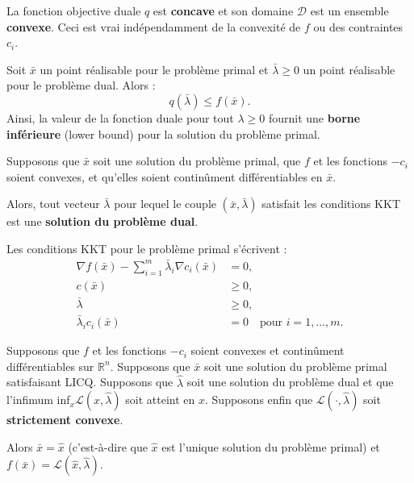 \begin{theoreme}
    La fonction objective duale $q$ est \textbf{concave} et son domaine $\mathcal{D}$ est un ensemble \textbf{convexe}.
    Ceci est vrai indépendamment de la convexité de $f$ ou des contraintes $c_i$.
\end{theoreme}

\begin{theoreme}
    Soit $\bar{x}$ un point réalisable pour le problème primal et $\bar{\lambda} \geq 0$ un point réalisable pour le problème dual. Alors :
    \begin{equation}
        q(\bar{\lambda}) \leq f(\bar{x}).
    \end{equation}
    Ainsi, la valeur de la fonction duale pour tout $\lambda \geq 0$ fournit une \textbf{borne inférieure} (lower bound) pour la solution du problème primal.
\end{theoreme}

\begin{theoreme}
    Supposons que $\bar{x}$ soit une solution du problème primal, que $f$ et les fonctions $-c_i$ soient convexes, et qu'elles soient continûment différentiables en $\bar{x}$.
    
    Alors, tout vecteur $\bar{\lambda}$ pour lequel le couple $(\bar{x}, \bar{\lambda})$ satisfait les conditions KKT est une \textbf{solution du problème dual}.
\end{theoreme}

\begin{remarque}
    Les conditions KKT pour le problème primal s'écrivent :
    \begin{align*}
        \nabla f(\bar{x}) - \sum_{i=1}^m \bar{\lambda}_i \nabla c_i(\bar{x}) &= 0, \\
        c(\bar{x}) &\geq 0, \\
        \bar{\lambda} &\geq 0, \\
        \bar{\lambda}_i c_i(\bar{x}) &= 0 \quad \text{pour } i=1,\dots,m.
    \end{align*}
\end{remarque}

\begin{theoreme}
    Supposons que $f$ et les fonctions $-c_i$ soient convexes et continûment différentiables sur $\mathbb{R}^n$.
    Supposons que $\bar{x}$ soit une solution du problème primal satisfaisant LICQ.
    Supposons que $\hat{\lambda}$ soit une solution du problème dual et que l'infimum inf$_x \mathcal{L}(x, \hat{\lambda})$ soit atteint en $\hat{x}$.
    Supposons enfin que $\mathcal{L}(\cdot, \hat{\lambda})$ soit \textbf{strictement convexe}.
    
    Alors $\bar{x} = \hat{x}$ (c'est-à-dire que $\hat{x}$ est l'unique solution du problème primal) et $f(\bar{x}) = \mathcal{L}(\hat{x}, \hat{\lambda})$.
\end{theoreme}

